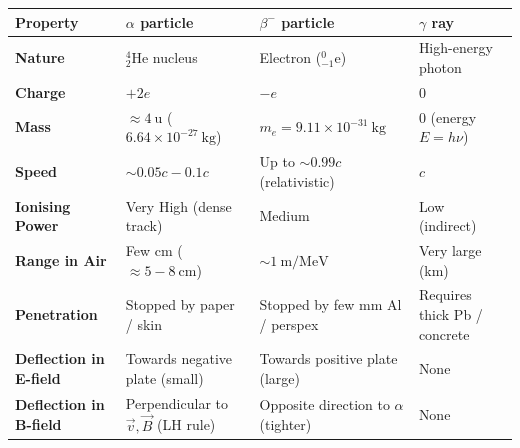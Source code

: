 \documentclass[11pt]{article}
\begin{document}
\begin{aretenir}
\begin{center}
\begin{tabularx}{\linewidth}{|l|X|X|X|}\hline
\rowcolor{popblueL}
\textbf{Property} & \textbf{$\alpha$ particle} & \textbf{$\beta^-$ particle} & \textbf{$\gamma$ ray} \\ \hline
\textbf{Nature} & $\ensuremath{\mathrm{^{4}_{2}He}}$ nucleus & Electron ($\ensuremath{\mathrm{^{0}_{-1}e}}$) & High-energy photon \\ \hline
\textbf{Charge} & $+2e$ & $-e$ & $0$ \\ \hline
\textbf{Mass} & $\approx 4\ \text{u}$ ($6.64 \times 10^{-27}\ \text{kg}$) & $m_e = 9.11 \times 10^{-31}\ \text{kg}$ & $0$ (energy $E=h\nu$) \\ \hline
\textbf{Speed} & $\sim 0.05c - 0.1c$ & Up to $\sim 0.99c$ (relativistic) & $c$ \\ \hline
\textbf{Ionising Power} & Very High (dense track) & Medium & Low (indirect) \\ \hline
\textbf{Range in Air} & Few cm ($\approx 5-8\ \text{cm}$) & $\sim 1\ \text{m} / \text{MeV}$ & Very large (km) \\ \hline
\textbf{Penetration} & Stopped by paper / skin & Stopped by few mm Al / perspex & Requires thick Pb / concrete \\ \hline
\textbf{Deflection in E-field} & Towards negative plate (small) & Towards positive plate (large) & None \\ \hline
\textbf{Deflection in B-field} & Perpendicular to $\vec{v}, \vec{B}$ (LH rule) & Opposite direction to $\alpha$ (tighter) & None \\ \hline
\end{tabularx}
\end{center}
\end{aretenir}
\end{document}

